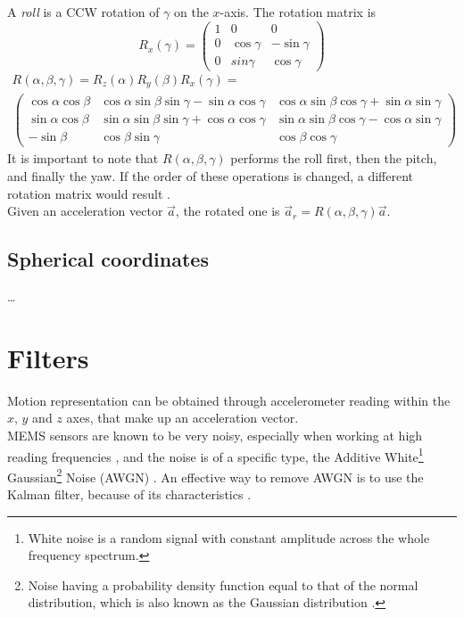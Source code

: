 A \textit{roll} is a CCW rotation of $\gamma$ on the $x$-axis. The rotation matrix is
\[
	R_x(\gamma) =
	\begin{pmatrix}
		1 & 0 & 0 \\
		0 & \cos\gamma & -\sin\gamma \\
		0 & sin\gamma & \cos\gamma
	\end{pmatrix}
\]
\begin{gather*}
	R(\alpha, \beta, \gamma) = R_z(\alpha) R_y(\beta) R_x(\gamma) = \\
	\begin{pmatrix}
		\cos\alpha \cos\beta & \cos\alpha \sin\beta \sin\gamma - \sin\alpha \cos\gamma & \cos\alpha \sin\beta \cos\gamma + \sin\alpha \sin\gamma \\
		\sin\alpha \cos\beta & \sin\alpha \sin\beta \sin\gamma + \cos\alpha \cos\gamma & \sin\alpha \sin\beta \cos\gamma - \cos\alpha \sin\gamma \\
		-\sin\beta & \cos\beta \sin\gamma & \cos\beta \cos\gamma
	\end{pmatrix}
\end{gather*}
It is important to note that $R(\alpha, \beta, \gamma)$ performs the roll first, then the pitch, and finally the yaw. If the order of these operations is changed, a different rotation matrix would result \cite{Lav06}.\\
Given an acceleration vector $\vec a$, the rotated one is $\vec a_r = R(\alpha, \beta, \gamma) \vec a$.

\subsection{Spherical coordinates}
\dots

\section{Filters}
Motion representation can be obtained through accelerometer reading within the $x$, $y$ and $z$ axes, that make up an acceleration vector.\\
MEMS sensors are known to be very noisy, especially when working at high reading frequencies \cite[7]{Mat08}, and the noise is of a specific type, the Additive White\footnote{White noise is a random signal with constant amplitude across the whole frequency spectrum.} Gaussian\footnote{Noise having a probability density function equal to that of the normal distribution, which is also known as the Gaussian distribution \cite{WikipediaGaussianNoise}.} Noise (AWGN) \cite{Yas03}. An effective way to remove AWGN is to use the Kalman filter, because of its characteristics \cite{Ko07, Sär15}.

